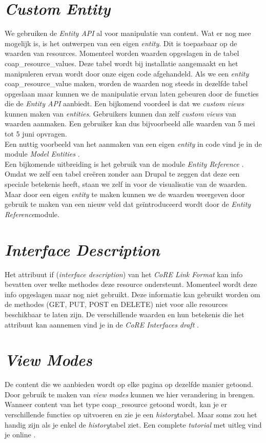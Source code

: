 \section{\textit{Custom Entity}} \label{customEntity}
We gebruiken de \textit{Entity API} al voor manipulatie van content. Wat er nog mee mogelijk is, is het ontwerpen van een eigen \textit{entity}. Dit is toepasbaar op de waarden van resources. Momenteel worden waarden opgeslagen in de tabel coap\_resource\_values. Deze tabel wordt bij installatie aangemaakt en het manipuleren ervan wordt door onze eigen code afgehandeld. Als we een \textit{entity} coap\_resource\_value maken, worden de waarden nog steeds in dezelfde tabel opgeslaan maar kunnen we de manipulatie ervan laten gebeuren door de functies die de \textit{Entity API} aanbiedt. Een bijkomend voordeel is dat we \textit{custom views} kunnen maken van \textit{entities}. Gebruikers kunnen dan zelf \textit{custom views} van waarden aanmaken. Een gebruiker kan dus bijvoorbeeld alle waarden van 5 mei tot 5 juni opvragen.\\
Een nuttig voorbeeld van het aanmaken van een eigen \textit{entity} in code vind je in de module \textit{Model Entities} \cite{modelEntities}.\\

Een bijkomende uitbreiding is het gebruik van de module \textit{Entity Reference} \cite{entityReference}. Omdat we zelf een tabel cre\"{e}ren zonder aan Drupal te zeggen dat deze een speciale betekenis heeft, staan we zelf in voor de visualisatie van de waarden. Maar door een eigen \textit{entity} te maken kunnen we de waarden weergeven door gebruik te maken van een nieuw veld dat ge\"{i}ntroduceerd wordt door de \textit{Entity Reference}module.

\section{\textit{Interface Description}}
Het attribuut if (\textit{interface description}) van het \textit{CoRE Link Format} kan info bevatten over welke methodes deze resource ondersteunt. Momenteel wordt deze info opgeslagen maar nog niet gebruikt. Deze informatie kan gebruikt worden om de methodes (GET, PUT, POST en DELETE) niet voor alle resources beschikbaar te laten zijn. De verschillende waarden en hun betekenis die het attribuut kan aannemen vind je in de \textit{CoRE Interfaces draft} \cite{coreInterfaces}.

\section{\textit{View Modes}}
De content die we aanbieden wordt op elke pagina op dezelfde manier getoond. Door gebruik te maken van \textit{view modes} kunnen we hier verandering in brengen. Wanneer content van het type coap\_resource getoond wordt, kan je er verschillende functies op uitvoeren en zie je een \textit{history}tabel. Maar soms zou het handig zijn als je enkel de \textit{history}tabel ziet. Een complete \textit{tutorial} met uitleg vind je online \cite{viewMode}.

